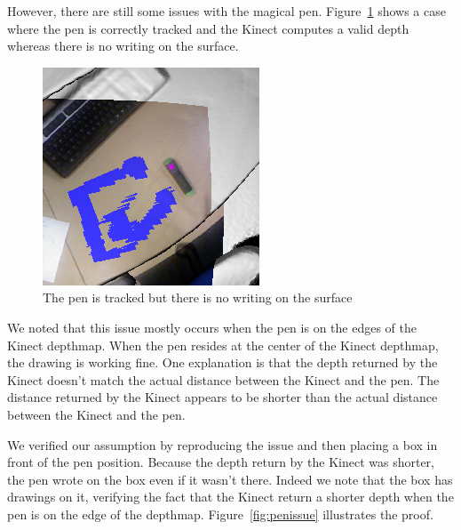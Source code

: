 \documentclass[12pt]{article}
\begin{document}
However, there are still some issues with the magical pen. Figure~\ref{fig:nowrite} shows a case where the pen is correctly tracked and the Kinect computes a valid depth whereas there is no writing on the surface.

\begin{figure}[!h]
  \centering
  \includegraphics[scale=0.4]{NoWrite.png}
  \caption{\label{fig:nowrite} The pen is tracked but there is no writing on the surface}
\end{figure}

We noted that this issue mostly occurs when the pen is on the edges of the Kinect depthmap. When the pen resides at the center of the Kinect depthmap, the drawing is working fine. One explanation is that the depth returned by the Kinect doesn't match the actual distance between the Kinect and the pen. The distance returned by the Kinect appears to be shorter than the actual distance between the Kinect and the pen.

We verified our assumption by reproducing the issue and then placing a box in front of the pen position. Because the depth return by the Kinect was shorter, the pen wrote on the box even if it wasn't there. Indeed we note that the box has drawings on it, verifying the fact that the Kinect return a shorter depth when the pen is on the edge of the depthmap. Figure~\ref{fig:penissue} illustrates the proof.
\end{document}
